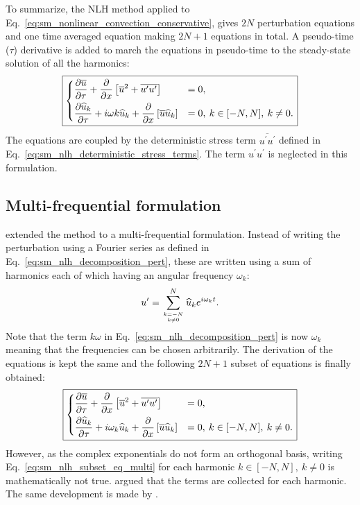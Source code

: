 To summarize, the NLH
method applied to Eq.~\eqref{eq:sm_nonlinear_convection_conservative},
gives $2N$ perturbation equations and one time
averaged equation making $2N+1$ equations in total. 
A pseudo-time ($\tau$) derivative is
added to march the equations in pseudo-time to the steady-state 
solution of all the harmonics:
\begin{equation}
	\fbox{$
	\begin{dcases}
		\frac{\partial \overline{u}}{\partial \tau} + 
		\frac{\partial}{\partial x}
			\left[\overline{u}^2 + 
			\overline{u^\prime u^\prime}\right] &=
			0, \\
		\frac{\partial \widehat{u}_k}{\partial \tau} + 
		i \omega k \widehat{u}_k + 
			\frac{\partial}{\partial x} 
			\left[ \overline{u} \widehat{u}_k\right] &= 
			0, \: k \in [-N, N], \: k \neq 0.
	\end{dcases}
	$}
	\label{eq:sm_nlh_subset_eq}
\end{equation}
The equations are coupled by the deterministic 
stress term $\overline{u^\prime u^\prime}$
defined in Eq.~\eqref{eq:sm_nlh_deterministic_stress_terms}.
The term $u^\prime u^\prime$ is neglected in this formulation.

\subsection{Multi-frequential formulation}

\citet{He2002} extended the method to a multi-frequential
formulation. Instead of writing the perturbation
using a Fourier series as defined in Eq.~\eqref{eq:sm_nlh_decomposition_pert},
these are written using a sum of harmonics each of which
having an angular frequency $\omega_k$:
\begin{equation}
	u^\prime = \sum_{k=-N \atop k \neq 0}^{N} 
	\widehat{u}_k e^{i \omega_k t}.
	\label{eq:sm_nlh_decomposition_pert_multi}
\end{equation}
Note that the term $k \omega$ in Eq.~\eqref{eq:sm_nlh_decomposition_pert}
is now $\omega_k$ meaning that the frequencies can be chosen
arbitrarily.
The derivation of the equations is kept the same and the following
$2N+1$ subset of equations is finally obtained:
\begin{equation}
	\fbox{$
	\begin{dcases}
		\frac{\partial \overline{u}}{\partial \tau} +
		\frac{\partial}{\partial x}
			\left[\overline{u}^2 + 
			\overline{u^\prime u^\prime}\right] &=
			0, \\
		\frac{\partial \widehat{u}_k}{\partial \tau} + 
		i \omega_k \widehat{u}_k + 
			\frac{\partial}{\partial x} 
			\left[ \overline{u} \widehat{u}_k\right] &= 
			0, \: k \in [-N, N], \: k \neq 0.
	\end{dcases}
	$}
	\label{eq:sm_nlh_subset_eq_multi}
\end{equation}
However, as the complex exponentials do not form
an orthogonal basis, writing Eq.~\eqref{eq:sm_nlh_subset_eq_multi}
for each harmonic $k \in [-N, N], \: k \neq 0$ is mathematically
not true. \citet{He2002} argued that the terms
are collected for each harmonic. 
The same development is made by \citet{Vilmin2006}.

